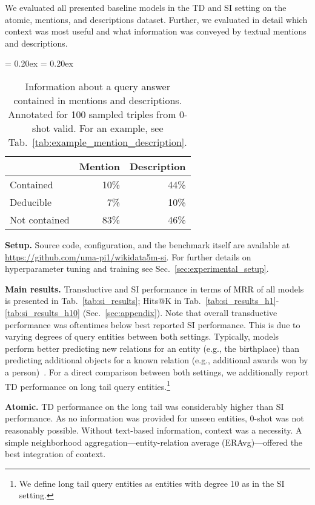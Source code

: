 \documentclass[11pt]{article}
\renewcommand\:{\colon} \newcommand{\sset}[1]{\left\{\,#1\,\right\}} \newcommand{\ssets}[1]{\left\{#1\right\}} \newcommand{\ssetn}[1]{\{\,#1\,\}}
\begin{document}
We evaluated all presented baseline models in the TD and SI setting on the atomic, mentions, and descriptions dataset.
Further, we evaluated in detail which context was most useful and what information was conveyed by textual mentions and descriptions.


\begin{table}[ht]
  \centering
  \resizebox{0.9\columnwidth}{!}
  {
  \aboverulesep = 0.20ex
  \belowrulesep = 0.20ex
  \begin{tabular}{lrr}
    \toprule
    & \textbf{Mention} & \textbf{Description} \\
    \midrule
    Contained & 10\% & 44\% \\
    Deducible & 7\% & 10\% \\
    Not contained & 83\% & 46\% \\
    \bottomrule
  \end{tabular}
  }
  \caption{
    Information about a query answer contained in mentions and descriptions.
    Annotated for 100 sampled triples from 0-shot valid.
    For an example, see Tab.~\ref{tab:example_mention_description}.
  }
  \label{tab:text_information}
\end{table}



\textbf{Setup.}
Source code, configuration, and the benchmark itself are available at \url{https://github.com/uma-pi1/wikidata5m-si}.
For further details on hyperparameter tuning and training see Sec.~\ref{sec:experimental_setup}.



\textbf{Main results.}
Transductive and SI performance in terms of MRR of all models is presented in Tab.~\ref{tab:si_results};
Hits@K  in Tab.~\ref{tab:si_results_h1}-\ref{tab:si_results_h10} (Sec.~\ref{sec:appendix}).
Note that overall transductive performance was oftentimes below best reported SI performance.
This is due to varying degrees of query entities between both settings.
Typically, models perform better predicting new relations for an entity (e.g., the birthplace) than predicting additional objects for a known relation (e.g., additional awards won by a person)~\cite{saxena2022sequence,kochsiek2023friendly}.
For a direct comparison between both settings, we additionally report TD performance on long tail query entities.\footnote{We define long tail query entities as entities with degree  10 as in the SI setting.}

\textbf{Atomic.}
TD performance on the long tail was considerably higher than SI performance.
As no information was provided for unseen entities, 0-shot was not reasonably possible.
Without text-based information, context was a necessity.
A simple neighborhood aggregation---entity-relation average (ERAvg)---offered the best integration of context.
\end{document}
